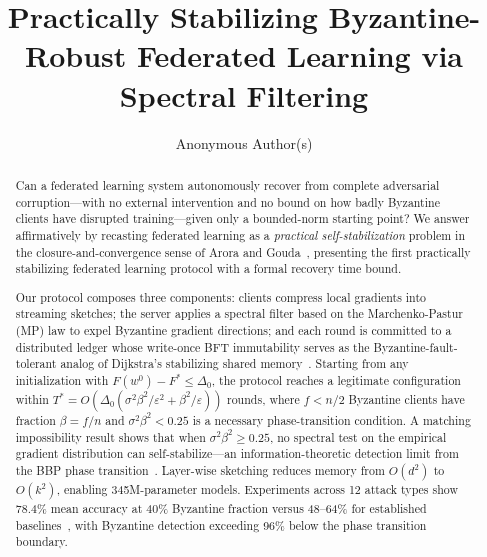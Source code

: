\documentclass[runningheads]{llncs}
\begin{document}
\title{Practically Stabilizing Byzantine-Robust Federated Learning via Spectral Filtering}

\author{Anonymous Author(s)}

\maketitle

\begin{abstract}
Can a federated learning system autonomously recover from complete adversarial
corruption---with no external intervention and no bound on how badly Byzantine clients
have disrupted training---given only a bounded-norm starting point?
We answer affirmatively by recasting federated learning as a \emph{practical
self-stabilization} problem in the closure-and-convergence sense of Arora and
Gouda~\cite{arora_gouda}, presenting the first practically stabilizing federated
learning protocol with a formal recovery time bound.

Our protocol composes three components: clients compress local gradients into streaming
sketches; the server applies a spectral filter based on the Marchenko-Pastur (MP) law
to expel Byzantine gradient directions; and each round is committed to a distributed
ledger whose write-once BFT immutability serves as the Byzantine-fault-tolerant analog
of Dijkstra's stabilizing shared memory~\cite{dijkstra_self_stab}.
Starting from any initialization with $F(w^0)-F^* \leq \Delta_0$, the protocol reaches
a legitimate configuration within
$T^* = O\!\left(\Delta_0\!\left(\sigma^2\beta^2/\varepsilon^2 + \beta^2/\varepsilon\right)\right)$ rounds,
where $f < n/2$ Byzantine clients have fraction $\beta = f/n$ and $\sigma^2\beta^2 < 0.25$
is a necessary phase-transition condition.
A matching impossibility result shows that when $\sigma^2\beta^2 \geq 0.25$, no
spectral test on the empirical gradient distribution can self-stabilize---an
information-theoretic detection limit from the BBP phase transition~\cite{bbp_transition}.
Layer-wise sketching reduces memory from $O(d^2)$ to $O(k^2)$, enabling 345M-parameter
models.
Experiments across 12 attack types show 78.4\% mean accuracy at 40\% Byzantine fraction
versus 48--64\% for established baselines~\cite{krum,byzantine_ml,crfl,flame},
with Byzantine detection exceeding 96\% below the phase transition boundary.
\end{abstract}
















\appendix

\end{document}
